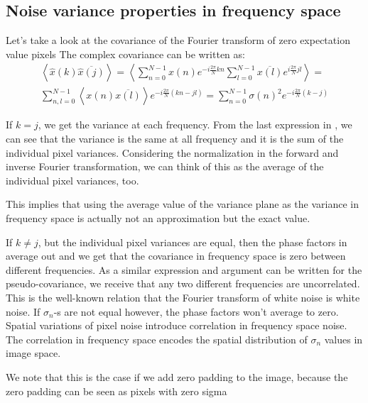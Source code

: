 \documentclass[11pt]{article}
\begin{document}
\subsection{Noise variance properties in frequency space\label{sec:noise_freq_space}}
%
\par Let's take a look at the covariance of the Fourier transform of zero
expectation value pixels The complex covariance can be written as:
\begin{equation}
\begin{split}
\left\langle \hat{x}(k) \overline{\hat{x}(j)} \right\rangle =
\left\langle \sum_{n=0}^{N-1} x(n) e^{-i\frac{2\pi}{N}kn}
 \sum_{l=0}^{N-1} \overline{x(l)} e^{i\frac{2\pi}{N}jl} \right\rangle = \\
\sum_{n,l=0}^{N-1} \left\langle x(n)\overline{x(l)}\right\rangle e^{-i\frac{2\pi}{N}(kn - jl)} =
\sum_{n=0}^{N-1} \sigma(n)^2 e^{-i\frac{2\pi}{N}(k-j)}
\label{eq:freq_cov}
\end{split}
\end{equation}
%
\par If \(k=j\), we get the variance at each frequency. From the last
expression in , we can see that the variance is the same
at all frequency and it is the sum of the individual pixel
variances. Considering the normalization in the forward and inverse Fourier
transformation, we can think of this as the average of the individual pixel
variances, too.
%
\par This implies that using the average value of the variance plane as the
variance in frequency space is actually not an approximation but the exact
value.
%
\par If \(k\neq j\), but the individual pixel variances are equal, then the
phase factors in  average out and we get that the
covariance in frequency space is zero between different frequencies. As a
similar expression and argument can be written for the pseudo-covariance, we
receive that any two different frequencies are uncorrelated. This is the
well-known relation that the Fourier transform of white noise is white noise. If
\(\sigma_n\)-s are not equal however, the phase factors won't average to
zero. Spatial variations of pixel noise introduce correlation in frequency
space noise. The correlation in frequency space encodes the spatial
distribution of \(\sigma_n\) values in image space.
%
\par We note that this is the case if we add zero padding to the
image, because the zero padding can be seen as pixels with zero sigma
\end{document}
